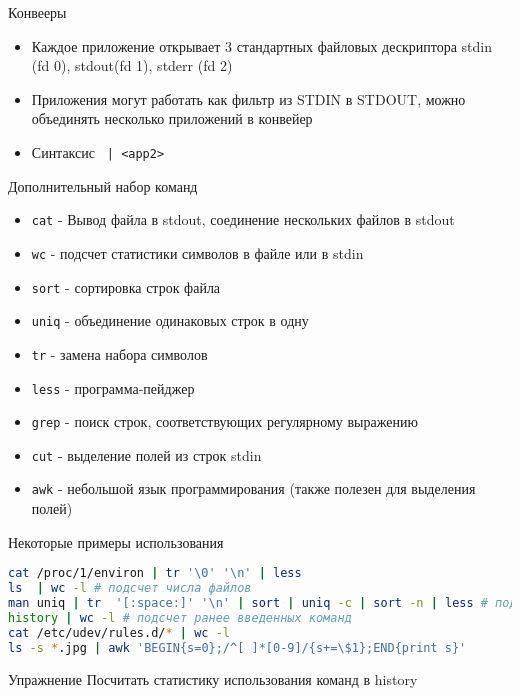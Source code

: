 \begin{frame}{Конвееры}
  \begin{itemize}
    \item <1-> Каждое приложение открывает 3 стандартных файловых дескриптора stdin (fd 0), stdout(fd 1), stderr (fd 2)
    \item <2-> Приложения могут работать как фильтр из STDIN в STDOUT, можно объединять несколько приложений в конвейер
    \item <2-> Синтаксис {\tt <app1> | <app2>}
  \end{itemize}
\end{frame}

\begin{frame}{Дополнительный набор команд}
  \begin{itemize}
    \item {\tt cat} - Вывод файла в stdout, соединение нескольких файлов в stdout
    \item {\tt wc} - подсчет статистики символов в файле или в stdin 
    \item {\tt sort} - сортировка строк файла
    \item {\tt uniq} - объединение одинаковых строк в одну
    \item {\tt tr} - замена набора символов
    \item {\tt less} - программа-пейджер
    \item {\tt grep} - поиск строк, соответствующих регулярному выражению
    \item {\tt cut} - выделение полей из строк stdin
    \item {\tt awk} - небольшой язык программирования (также полезен для выделения полей)
  \end{itemize}
\end{frame}

\begin{frame}[fragile]{Некоторые примеры использования}
\begin{lstlisting}[language=bash]
cat /proc/1/environ | tr '\0' '\n' | less
ls  | wc -l # подсчет числа файлов
man uniq | tr  '[:space:]' '\n' | sort | uniq -c | sort -n | less # подсчет количества слов в тексте man uniq
history | wc -l # подсчет ранее введенных команд
cat /etc/udev/rules.d/* | wc -l
ls -s *.jpg | awk 'BEGIN{s=0};/^[ ]*[0-9]/{s+=\$1};END{print s}' 
\end{lstlisting}
  \pause
  \begin{block}{Упражнение}
    Посчитать статистику использования команд в history
  \end{block}
\end{frame}

